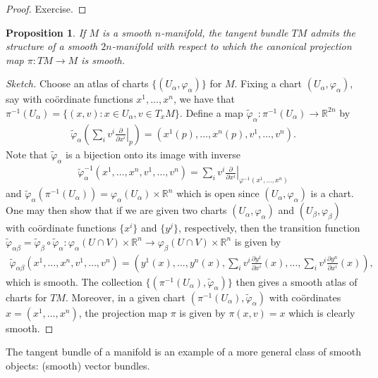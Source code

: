 \documentclass{amsart}          %
\newtheorem{proposition}[theorem]{Proposition}
\newcommand{\R}{\mathbb R}
\newcommand{\pdiff}[2]{\frac{\partial #1}{\partial #2}}
\begin{document}
\begin{proof}
	Exercise.
\end{proof}
\begin{proposition}
	If $M$ is a smooth $n$-manifold, the tangent bundle $TM$ admits the structure of a smooth $2n$-manifold with respect to which the canonical projection map $\pi:TM\to M$ is smooth.
\end{proposition}
\begin{proof}[Sketch]
	Choose an atlas of charts $\{(U_\alpha,\varphi_\alpha)\}$ for $M$. Fixing a chart $(U_\alpha,\varphi_\alpha)$, say with co\"{o}rdinate functions $x^1,\dots,x^n$, we have that $\pi^{-1}(U_\alpha)=\{(x,v):x\in U_\alpha,v\in T_xM\}$. Define a map $\widetilde{\varphi}_\alpha:\pi^{-1}(U_\alpha)\to\R^{2n}$ by\begin{align*}
	\widetilde{\varphi}_\alpha\left(\sum_{i}v^i\left.\pdiff{}{x^i}\right|_p\right)=\left(x^1(p),\dots,x^n(p),v^1,\dots,v^n\right).
	\end{align*}Note that $\widetilde{\varphi}_\alpha$ is a bijection onto its image with inverse\begin{align*}
	\widetilde{\varphi}^{-1}_\alpha\left(x^1,\dots,x^n,v^1,\dots,v^n\right)=\sum_{i}v^i\left.\pdiff{}{x^i}\right|_{\varphi^{-1}(x^1,\dots,x^n)}
	\end{align*} and $\widetilde{\varphi}_\alpha(\pi^{-1}(U_\alpha))=\varphi_\alpha(U_\alpha)\times\R^n$ which is open since $(U_\alpha,\varphi_\alpha)$ is a chart. One may then show that if we are given two charts $(U_\alpha,\varphi_\alpha)$ and $(U_\beta,\varphi_\beta)$ with co\"{o}rdinate functions $\{x^i\}$ and $\{y^j\}$, respectively, then the transition function $\widetilde{\varphi}_{\alpha\beta}=\widetilde{\varphi}_\beta\circ\widetilde{\varphi}_\alpha:\varphi_\alpha(U\cap V)\times\R^n\to\varphi_\beta(U\cap V)\times\R^n$ is given by\begin{align*}
	\widetilde{\varphi}_{\alpha\beta}\left(x^1,\dots,x^n,v^1,\dots,v^n\right)=\left(y^1(x),\dots,y^n(x),\sum_{i}v^i\pdiff{y^1}{x^i}(x),\dots,\sum_{i}v^i\pdiff{y^n}{x^i}(x)\right),
	\end{align*}which is smooth. The collection $\{(\pi^{-1}(U_\alpha),\widetilde{\varphi}_\alpha)\}$ then gives a smooth atlas of charts for $TM$. Moreover, in a given chart $(\pi^{-1}(U_\alpha),\widetilde{\varphi}_\alpha)$ with co\"{o}rdinates $x=(x^1,\dots,x^n)$, the projection map $\pi$ is given by $\pi(x,v)=x$ which is clearly smooth.
\end{proof}
The tangent bundle of a manifold is an example of a more general class of smooth objects: (smooth) vector bundles.
\end{document}
